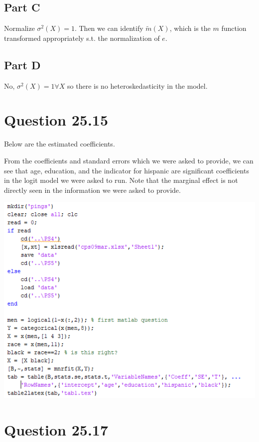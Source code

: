 \documentclass[11pt]{article} %
\begin{document}
\subsection{Part C}
Normalize $\sigma^2(X) = 1.$ Then we can identify $\tilde{m}(X)$, which is the $m$ function transformed appropriately s.t. the normalization of $e$.
\subsection{Part D}
No, $\sigma^2(X) = 1 \forall X$ so there is no heteroskedasticity in the model.
\section{Question 25.15} 

Below are the estimated coefficients.

\begin{center}

\end{center}

From the coefficients and standard errors which we were asked to provide, we can see that age, education, and the indicator for hispanic are significant coefficients in the logit model we were asked to run. Note that the marginal effect is not directly seen in the information we were asked to provide. 

\includegraphics{p1}

\section{Question 25.17} %
\end{document}
